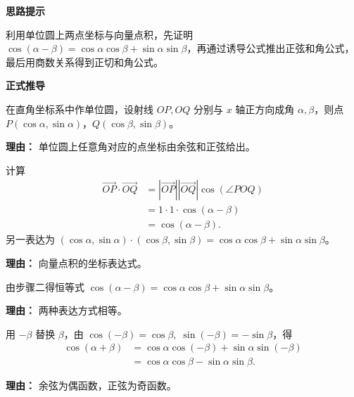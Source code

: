 \begin{proofbox}
	\textbf{\textcolor{CProof}{思路提示}}

	利用单位圆上两点坐标与向量点积，先证明 $\cos(\alpha-\beta)=\cos\alpha\cos\beta+\sin\alpha\sin\beta$，再通过诱导公式推出正弦和角公式，最后用商数关系得到正切和角公式。

	\medskip
	\textbf{\textcolor{CProof}{正式推导}}
	\begin{description}[style=nextline, leftmargin=2.8em, labelsep=0.5em, itemsep=0.55em]
		\item[\textbf{步骤一（建立单位圆）：}] 在直角坐标系中作单位圆，设射线 $OP,OQ$ 分别与 $x$ 轴正方向成角 $\alpha,\beta$，则点 $P(\cos\alpha,\sin\alpha)$，$Q(\cos\beta,\sin\beta)$。
			\par\textbf{理由：} 单位圆上任意角对应的点坐标由余弦和正弦给出。

		\item[\textbf{步骤二（向量点积）：}] 计算
			\[
				\begin{aligned}
					\overrightarrow{OP}\cdot\overrightarrow{OQ} &= |\overrightarrow{OP}||\overrightarrow{OQ}|\cos(\angle POQ) \\
					&= 1\cdot1\cdot\cos(\alpha-\beta) \\
					&= \cos(\alpha-\beta).
			\end{aligned}
			\]
			另一表达为 $(\cos\alpha,\sin\alpha)\cdot(\cos\beta,\sin\beta)=\cos\alpha\cos\beta+\sin\alpha\sin\beta$。
			\par\textbf{理由：} 向量点积的坐标表达式。

		\item[\textbf{步骤三（余弦差公式）：}] 由步骤二得恒等式 $\cos(\alpha-\beta)=\cos\alpha\cos\beta+\sin\alpha\sin\beta$。
			\par\textbf{理由：} 两种表达方式相等。

		\item[\textbf{步骤四（余弦和公式）：}] 用 $-\beta$ 替换 $\beta$，由 $\cos(-\beta)=\cos\beta,\;\sin(-\beta)=-\sin\beta$，得
			\[
				\begin{aligned}
					\cos(\alpha+\beta) &= \cos\alpha\cos(-\beta)+\sin\alpha\sin(-\beta) \\
					&= \cos\alpha\cos\beta-\sin\alpha\sin\beta.
			\end{aligned}
			\]
			\par\textbf{理由：} 余弦为偶函数，正弦为奇函数。


\end{description}
\end{proofbox}
